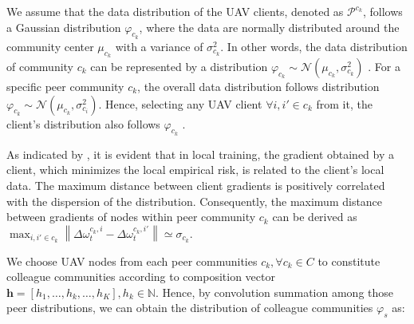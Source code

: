 \documentclass[lettersize,journal]{IEEEtran}
\begin{document}
We assume that the data distribution of the UAV clients, denoted as $\mathcal{P}^{c_{k}}$, follows a Gaussian distribution $\varphi_{c_{k}}$, where the data are normally distributed around the community center $\mu_{c_{k}}$ with a variance of $\sigma_{c_{k}}^{2}$. In other words, the data distribution of community $c_{k}$ can be represented by a distribution $\varphi_{c_{k}} \sim \mathcal{N}\left(\mu_{c_{k}}, \sigma_{c_{k}}^{2}\right)$ \cite{wei2020federated-NbAFL}. 
For a specific peer community $c_{k}$, the overall data distribution follows distribution $\varphi_{c_{k}} \sim \mathcal{N}\left(\mu_{c_{k}}, \sigma_{c_i}^{2}\right)$. Hence, selecting any UAV client $\forall i,i'\in c_{k}$ from it, the client's distribution also follows $\varphi_{c_{k}}$ \cite{wei2021low}. 

As indicated by \cite{sattler2020clustered-CFL}, it is evident that in local training, the gradient obtained by a client, which minimizes the local empirical risk, is related to the client's local data. The maximum distance between client gradients is positively correlated with the dispersion of the distribution. Consequently, the maximum distance between gradients of nodes within peer community $c_{k}$ can be derived as $\max_{i,i'\in c_{k}} \left\| \Delta\omega_{t}^{c_{k},i}-\Delta\omega_{t}^{c_{k},i'}\right\| \simeq \sigma_{c_k}$. 
    

We choose UAV nodes from each peer communities $c_{k},\forall c_k \in C$ to constitute colleague communities according to composition vector $\textbf{h}=[h_{1},\ldots,h_{k},\ldots,h_{K}],  h_{k} \in \mathbb{N}$. Hence, by convolution summation among those peer distributions, we can obtain the distribution of colleague communities $\varphi_{s}$ as: 
\end{document}
